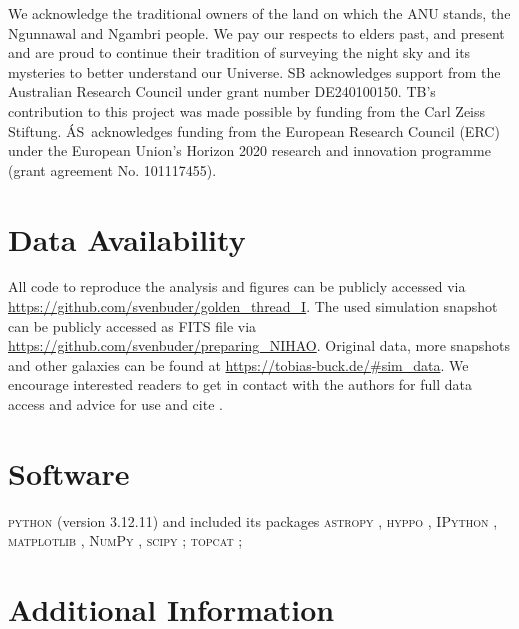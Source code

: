 \documentclass[fleqn,usenatbib]{mnras}
\begin{document}
We acknowledge the traditional owners of the land on which the ANU stands, the Ngunnawal and Ngambri people. We pay our respects to elders past, and present and are proud to continue their tradition of surveying the night sky and its mysteries to better understand our Universe. SB acknowledges support from the Australian Research Council under grant number DE240100150.
TB's contribution to this project was made possible by funding from the Carl Zeiss Stiftung. \'{A}S~acknowledges funding from the European Research Council (ERC) under the European Union’s Horizon 2020 research and innovation programme (grant agreement No. 101117455).

\section*{Data Availability}

All code to reproduce the analysis and figures can be publicly accessed via \url{https://github.com/svenbuder/golden_thread_I}.
The used simulation snapshot can be publicly accessed as FITS file via \url{https://github.com/svenbuder/preparing_NIHAO}. Original data, more snapshots and other galaxies can be found at \url{https://tobias-buck.de/#sim_data}. We encourage interested readers to get in contact with the authors for full data access and advice for use and cite \citet{Buck2020b, Buck2021}.

\section*{Software}

\textsc{python} (version 3.12.11) and included its packages
\textsc{astropy} \citep[v. 7.1.0;][]{Robitaille2013,PriceWhelan2018},
\textsc{hyppo} \citep[v. 0.5.2;][]{hyppo},
\textsc{IPython} \citep[v. 9.1.0;][]{ipython},
\textsc{matplotlib} \citep[v. 3.10.3;][]{matplotlib},
\textsc{NumPy} \citep[v. 2.2.6;][]{numpy},
\textsc{scipy} \citep[v. 1.16.0;][]{Scipy};
\textsc{topcat} \citep[v. 4.7;][]{Taylor2005};
 



\appendix

\section{Additional Information}
\end{document}
